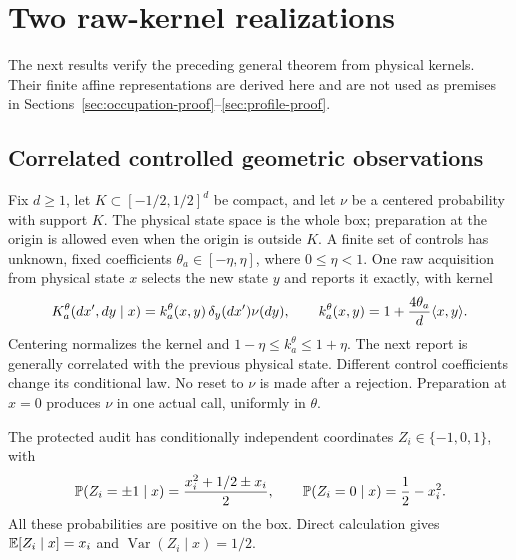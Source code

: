 \section{Two raw-kernel realizations}\label{sec:realizations}
The next results verify the preceding general theorem from physical kernels. Their finite affine representations are derived here and are not used as premises in Sections~\ref{sec:occupation-proof}--\ref{sec:profile-proof}.

\subsection{Correlated controlled geometric observations}
Fix $d\ge1$, let $K\subset[-1/2,1/2]^d$ be compact, and let $\nu$ be a centered probability with support $K$. The physical state space is the whole box; preparation at the origin is allowed even when the origin is outside $K$. A finite set of controls has unknown, fixed coefficients $\theta_a\in[-\eta,\eta]$, where $0\le\eta<1$. One raw acquisition from physical state $x$ selects the new state $y$ and reports it exactly, with kernel
\begin{equation}\label{eq:classical-kernel}
 K_a^\theta(dx',dy\mid x)
 =k_a^\theta(x,y)\,\delta_y(dx')\nu(dy),\qquad
 k_a^\theta(x,y)=1+\frac{4\theta_a}{d}\langle x,y\rangle.
\end{equation}
Centering normalizes the kernel and $1-\eta\le k_a^\theta\le1+\eta$. The next report is generally correlated with the previous physical state. Different control coefficients change its conditional law. No reset to $\nu$ is made after a rejection. Preparation at $x=0$ produces $\nu$ in one actual call, uniformly in $\theta$.

The protected audit has conditionally independent coordinates $Z_i\in\{-1,0,1\}$, with
\begin{equation}\label{eq:classical-audit}
 \mathbb P(Z_i=\pm1\mid x)=\frac{x_i^2+1/2\pm x_i}{2},
 \qquad \mathbb P(Z_i=0\mid x)=\frac12-x_i^2.
\end{equation}
All these probabilities are positive on the box. Direct calculation gives $\mathbb E[Z_i\mid x]=x_i$ and $\operatorname{Var}(Z_i\mid x)=1/2$.

